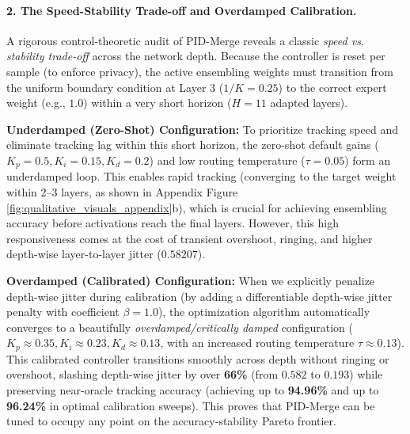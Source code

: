     \paragraph{2. The Speed-Stability Trade-off and Overdamped Calibration.}
    A rigorous control-theoretic audit of PID-Merge reveals a classic \emph{speed vs. stability trade-off} across the network depth. Because the controller is reset per sample (to enforce privacy), the active ensembling weights must transition from the uniform boundary condition at Layer 3 ($1/K = 0.25$) to the correct expert weight (e.g., $1.0$) within a very short horizon ($H = 11$ adapted layers).

    \textbf{Underdamped (Zero-Shot) Configuration:} To prioritize tracking speed and eliminate tracking lag within this short horizon, the zero-shot default gains ($K_p = 0.5, K_i = 0.15, K_d = 0.2$) and low routing temperature ($\tau = 0.05$) form an underdamped loop. This enables rapid tracking (converging to the target weight within 2--3 layers, as shown in Appendix Figure \ref{fig:qualitative_visuals_appendix}b), which is crucial for achieving ensembling accuracy before activations reach the final layers. However, this high responsiveness comes at the cost of transient overshoot, ringing, and higher depth-wise layer-to-layer jitter ($0.58207$).

    \textbf{Overdamped (Calibrated) Configuration:} When we explicitly penalize depth-wise jitter during calibration (by adding a differentiable depth-wise jitter penalty with coefficient $\beta = 1.0$), the optimization algorithm automatically converges to a beautifully \emph{overdamped/critically damped} configuration ($K_p \approx 0.35, K_i \approx 0.23, K_d \approx 0.13$, with an increased routing temperature $\tau \approx 0.13$). This calibrated controller transitions smoothly across depth without ringing or overshoot, slashing depth-wise jitter by over \textbf{66\%} (from $0.582$ to $0.193$) while preserving near-oracle tracking accuracy (achieving up to \textbf{94.96\%} and up to \textbf{96.24\%} in optimal calibration sweeps). This proves that PID-Merge can be tuned to occupy any point on the accuracy-stability Pareto frontier.


